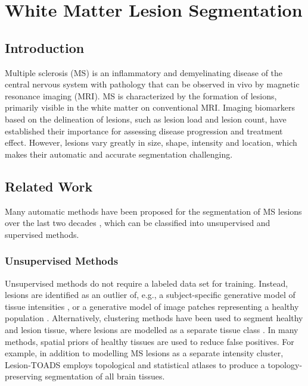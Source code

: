 \chapter{White Matter Lesion Segmentation}

\section{Introduction}

Multiple sclerosis (MS) is an inflammatory and demyelinating disease of the
central nervous system with pathology that can be observed in vivo by magnetic
resonance imaging (MRI). MS is characterized by the formation of lesions,
primarily visible in the white matter on conventional MRI. Imaging biomarkers
based on the delineation of lesions, such as lesion load and lesion count, have
established their importance for assessing disease progression and treatment
effect. However, lesions vary greatly in size, shape, intensity and location,
which makes their automatic and accurate segmentation challenging.

\section{Related Work}

Many automatic methods have been proposed for the segmentation of MS
\mbox{lesions} over the last two decades \cite{garcia2013}, which can be
classified into unsupervised and supervised methods.

\subsection{Unsupervised Methods}

Unsupervised methods do not require a labeled data set for training. Instead,
lesions are identified as an outlier of, e.g., a subject-specific generative
model of tissue intensities
\cite{vanleemput2001,tomas2015,schmidt2012automated,roura2015}, or a generative
model of image patches representing a healthy population \cite{weiss2013}.
Alternatively, clustering methods have been used to segment healthy and lesion
tissue, where lesions are modelled as a separate tissue class
\cite{shiee2010topology,sudre2015}. In many methods, spatial priors of healthy
tissues are used to reduce false positives. For example, in addition to
modelling MS lesions as a separate intensity cluster, Lesion-TOADS
\cite{shiee2010topology} employs topological and statistical atlases to produce
a topology-preserving segmentation of all brain tissues.

